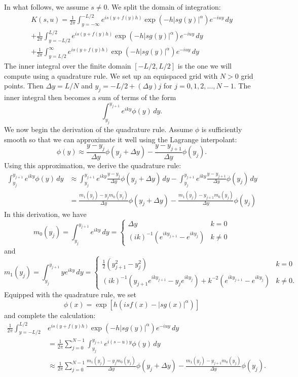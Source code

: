 \documentclass[11pt,letterpaper]{article}
\begin{document}
In what follows, we assume $s \neq 0$.  We split the domain of integration:
\begin{multline*}
K(s,u) = \frac{1}{2 \pi} \int_{y=-\infty}^{-L/2} e^{is\left(y+f(y)h\right)}\exp{\left(  -h |s g(y)|^{\alpha} \right)}e^{-iuy}\, dy \\
 + \frac{1}{2 \pi} \int_{y=-L/2}^{L/2} e^{is\left(y+f(y)h\right)}\exp{\left(  -h |s g(y)|^{\alpha} \right)}e^{-iuy}\, dy \\
 + \frac{1}{2 \pi} \int_{y=L/2}^{\infty} e^{is\left(y+f(y)h\right)}\exp{\left(  -h |s g(y)|^{\alpha} \right)}e^{-iuy}\, dy
\end{multline*}
The inner integral over the finite domain $[-L/2, L/2]$ is the one we will compute using a quadrature rule.  We set up an equispaced grid with $N > 0$ grid points.  Then $\Delta y = L/N$ and $y_j = -L/2 + (\Delta y) j$ for $j = 0, 1, 2, \ldots, N-1$.  The inner integral then becomes a sum of terms of the form
\[
\int_{y_j}^{y_{j+1}} e^{i k y} \phi(y) \, dy.
\]
We now begin the derivation of the quadrature rule.  Assume $\phi$ is sufficiently smooth so that we can approximate it well using the Lagrange interpolant:
\[
\phi(y) \approx \frac{y - y_j}{\Delta y} \phi(y_j + \Delta y) - \frac{y - y_{j+1}}{\Delta y} \phi(y_j).
\]
Using this approximation, we derive the quadrature rule:
\begin{align}
\int_{y_j}^{y_{j+1}} e^{i k y} \phi(y) \, dy &\approx \int_{y_j}^{y_{j+1}} e^{i k y} \frac{y - y_j}{\Delta y} \phi(y_j + \Delta y) \, dy - \int_{y_j}^{y_{j+1}} e^{i k y} \frac{y - y_{j+1}}{\Delta y} \phi(y_j) \, dy \nonumber \\
\label{eqn:quadrule}
 &= \frac{m_1(y_j) - y_j m_0(y_j)}{\Delta y} \phi(y_j + \Delta y) - \frac{m_1(y_j) - y_{j+1} m_0(y_j)}{\Delta y} \phi(y_j) 
\end{align}
In this derivation, we have
\[
m_0(y_j) = \int_{y_j}^{y_{j+1}} e^{i k y} \, dy = \begin{cases} \Delta y & k=0 \\ (ik)^{-1} (e^{i k y_{j+1}} - e^{i k y_j}) & k \neq 0 \end{cases}
\]
and
\[
m_1(y_j) = \int_{y_j}^{y_{j+1}} y e^{i k y} \, dy = \begin{cases} \frac{1}{2} (y_{j+1}^2 - y_j^2) & k = 0 \\ (i k)^{-1}( y_{j+1} e^{i k y_{j+1}} - y_j e^{i k y_j}) + k^{-2} (e^{i k y_{j+1}} - e^{i k y_j}) & k \neq 0. \end{cases}
\]
Equipped with the quadrature rule, we set
\[
\phi(x) = \exp \left[ h (i s f(x) - |s g(x) |^\alpha ) \right]
\]
and complete the calculation:
\begin{align}
\frac{1}{2 \pi} \int_{y=-L/2}^{L/2} & e^{is\left(y+f(y)h\right)}\exp{\left(  -h |s g(y)|^{\alpha} \right)}e^{-iuy}\, dy \nonumber \\
&= \frac{1}{2 \pi} \sum_{j=0}^{N-1} \int_{y_j}^{y_{j+1}} e^{i (s-u) y} \phi(y) \, dy \nonumber \\
\label{eqn:quadcalc}
&\approx \frac{1}{2 \pi} \sum_{j=0}^{N-1} \frac{m_1(y_j) - y_j m_0(y_j)}{\Delta y} \phi(y_j + \Delta y) - \frac{m_1(y_j) - y_{j+1} m_0(y_j)}{\Delta y} \phi(y_j).
\end{align}
\end{document}
